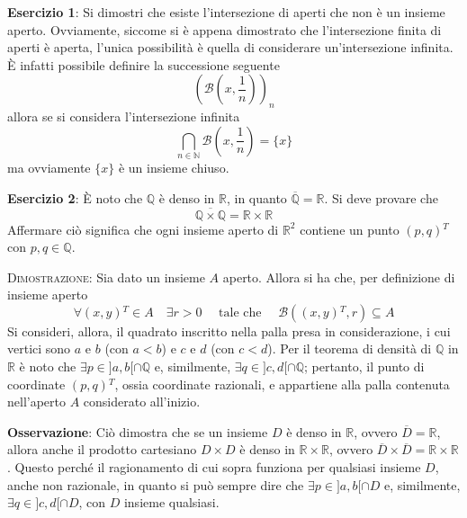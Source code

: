 \documentclass[a4paper]{extarticle}
\begin{document}
\vspace{2em}
\noindent
\textbf{Esercizio 1}: Si dimostri che esiste l'intersezione di aperti che non è un insieme aperto. Ovviamente, siccome si è appena dimostrato che l'intersezione finita di aperti è aperta, l'unica possibilità è quella di considerare un'intersezione infinita. È infatti possibile definire la successione seguente
\[\left(\mathcal{B} \left(x,\frac{1}{n}\right)\right)_n\]
allora se si considera l'intersezione infinita
\[\bigcap_{n \in \mathbb{N}} \mathcal{B} \left(x,\frac{1}{n}\right) = \{x\}\]
ma ovviamente $\{x\}$ è un insieme chiuso.

\vspace{2em}
\noindent
\textbf{Esercizio 2}: È noto che $\mathbb{Q}$ è denso in $\mathbb{R}$, in quanto $\overline{\mathbb{Q}}=\mathbb{R}$. Si deve provare che
\[\overline{\mathbb{Q} \times \mathbb{Q}} = \mathbb{R} \times \mathbb{R}\]
Affermare ciò significa che ogni insieme aperto di $\mathbb{R}^2$ contiene un punto $\left(p,q\right){^T}$ con $p,q \in \mathbb{Q}$.

\vspace{2em}
\noindent
\normalfont \normalsize
\textsc{Dimostrazione}: Sia dato un insieme $A$ aperto. Allora si ha che, per definizione di insieme aperto
\[\forall (x,y){^T} \in A \hspace{1em} \exists r > 0 \hspace{1em} \text{ tale che } \hspace{1em} \mathcal{B}((x,y){^T}, r) \subseteq A\]
Si consideri, allora, il quadrato inscritto nella palla presa in considerazione, i cui vertici sono $a$ e $b$ (con $a < b$) e $c$ e $d$ (con $c < d$). Per il teorema di densità di $\mathbb{Q}$ in $\mathbb{R}$ è noto che $\exists p \in ]a,b[ \cap \mathbb{Q}$ e, similmente, $\exists q \in ]c,d[ \cap \mathbb{Q}$; pertanto, il punto di coordinate $(p,q){^T}$, ossia coordinate razionali, e appartiene alla palla contenuta nell'aperto $A$ considerato all'inizio.

\vspace{1em}
\noindent
\textbf{Osservazione}: Ciò dimostra che se un insieme $D$ è denso in $\mathbb{R}$, ovvero $\overline{D} = \mathbb{R}$, allora anche il prodotto cartesiano $D \times D$ è denso in $\mathbb{R} \times \mathbb{R}$, ovvero $\overline{D} \times \overline{D} = \mathbb{R} \times \mathbb{R}$. Questo perché il ragionamento di cui sopra funziona per qualsiasi insieme $D$, anche non razionale, in quanto si può sempre dire che $\exists p \in ]a,b[ \cap D$ e, similmente, $\exists q \in ]c,d[ \cap D$, con $D$ insieme qualsiasi.
\end{document}
